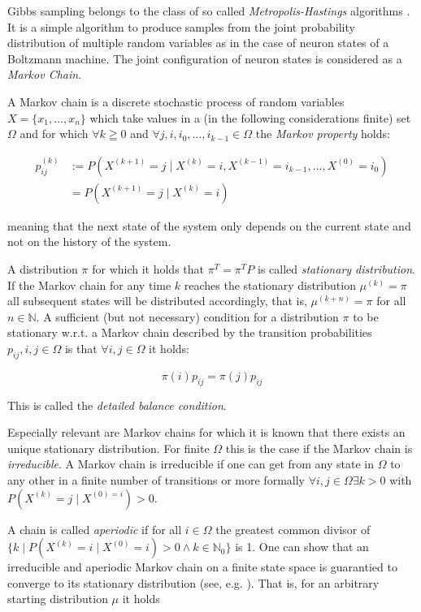 Gibbs sampling belongs to the class of so called \textit{Metropolis-Hastings} algorithms \cite{}.
It is a simple algorithm to produce samples from the joint probability distribution of multiple random
variables as in the case of neuron states of a Boltzmann machine. The joint configuration of neuron states
is considered as a \textit{Markov Chain}.

A Markov chain is a discrete stochastic process of random variables $X=\{x_1,\dots,x_n\}$ which take values 
in a (in the following considerations finite) set $\Omega$ and for which $\forall k \geqq 0$ and 
$\forall j,i,i_0,\dots,i_{k-1} \in \Omega$ the \textit{Markov property} holds:

\begin{align}
    p_{ij}^{(k)} &:=P(X^{(k+1)}=j \mid X^{(k)} = i, X^{(k-1)} = i_{k-1}, \dots, X^{(0)} = i_0) \\
                 & =P(X^{(k+1)}=j \mid X^{(k)} = i) 
\end{align}

meaning that the next state of the system only depends on the current state and not on the history of 
the system.

A distribution $\pi$ for which it holds that $\pi^T=\pi^TP$ is called \textit{stationary distribution}.
If the Markov chain for any time $k$ reaches the stationary distribution $\mu^{(k)}= \pi$ all subsequent
states will be distributed accordingly, that is, $\mu^{(k+n)}=\pi$ for all $n \in \mathbb{N}$.
A sufficient (but not necessary) condition for a distribution $\pi$ to be stationary w.r.t. a Markov 
chain described by the transition probabilities $p_{ij},i,j \in \Omega$ is that $\forall i,j \in \Omega$ 
it holds:

\begin{equation}
    \pi(i)p_{ij}= \pi(j)p_{ij}
\end{equation}

This is called the \textit{detailed balance condition}.

Especially relevant are Markov chains for which it is known that there exists an unique stationary distribution.
For finite $\Omega$ this is the case if the Markov chain is \textit{irreducible}. A Markov chain is 
irreducible if one can get from any state in $\Omega$ to any other in a finite number of transitions or 
more formally $\forall i, j \in \Omega \exists k > 0$ with $P(X^{(k)}=j \mid X^{(0)=i}) >0$.

A chain is called \textit{aperiodic} if for all $i \in \Omega$ the greatest common divisor of $\{k \mid P(X^{(k)} = i \mid
X^{(0)} = i) > 0 \land k \in \mathbb{N}_0\}$ is 1. One can show that an irreducible and aperiodic Markov 
chain on a finite state space is guarantied to converge to its stationary distribution (see, e.g. \cite{}).
That is, for an arbitrary starting distribution $\mu$ it holds

